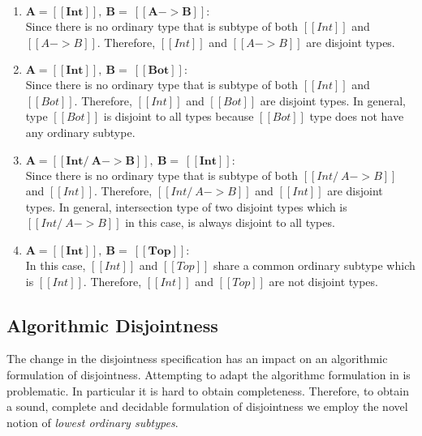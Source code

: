 \begin{enumerate}
  \item $\boldsymbol{A = [[Int]], \ B = \ [[A -> B]]:}$ \\
        Since there is no ordinary type that is subtype of both $[[Int]]$ and $[[A -> B]]$.
        Therefore, $[[Int]]$ and $[[A -> B]]$ are disjoint types.
  \item $\boldsymbol{A = [[Int]], \ B = \ [[Bot]]:}$ \\
        Since there is no ordinary type that is subtype of both $[[Int]]$ and $[[Bot]]$.
        Therefore, $[[Int]]$ and $[[Bot]]$ are disjoint types.
        In general, type $[[Bot]]$ is disjoint to all types because $[[Bot]]$ type does not
        have any ordinary subtype.
  \item $\boldsymbol{A = [[Int /\ A -> B]], \ B = \ [[Int]]:}$ \\
        Since there is no ordinary type that is subtype of both $[[Int /\ A -> B]]$ and $[[Int]]$.
        Therefore, $[[Int /\ A -> B]]$ and $[[Int]]$ are disjoint types.
        In general, intersection type of two disjoint types which is $[[Int /\ A -> B]]$ in this case,
        is always disjoint to all types.
  \item $\boldsymbol{A = [[Int]], \ B = \ [[Top]]:}$ \\
        In this case, $[[Int]]$ and $[[Top]]$ share a common ordinary subtype which is $[[Int]]$.
        Therefore, $[[Int]]$ and $[[Top]]$ are not disjoint types.
\end{enumerate}


\subsection{Algorithmic Disjointness}

The change in the disjointness specification has an impact on an algorithmic
formulation of disjointness. Attempting to adapt the algorithmc formulation
in  is problematic. In particular it is hard to obtain
completeness. Therefore, to obtain a sound, complete and decidable
formulation of disjointness we employ the novel notion of
\emph{lowest ordinary subtypes}.

